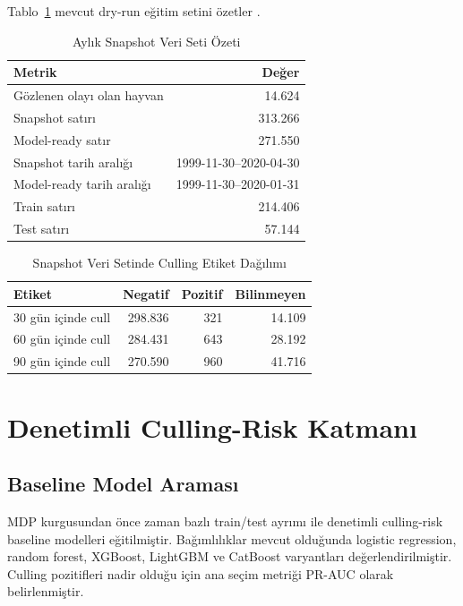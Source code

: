 \documentclass[conference]{IEEEtran}
\begin{document}
Tablo~\ref{tab:dataset_summary} mevcut dry-run eğitim setini özetler
\cite{projectreports}.

\begin{table}[!t]
\caption{Aylık Snapshot Veri Seti Özeti}
\label{tab:dataset_summary}
\centering
\begin{tabular}{lr}
\toprule
Metrik & Değer \\
\midrule
Gözlenen olayı olan hayvan & 14.624 \\
Snapshot satırı & 313.266 \\
Model-ready satır & 271.550 \\
Snapshot tarih aralığı & 1999-11-30--2020-04-30 \\
Model-ready tarih aralığı & 1999-11-30--2020-01-31 \\
Train satırı & 214.406 \\
Test satırı & 57.144 \\
\bottomrule
\end{tabular}
\end{table}

\begin{table}[!t]
\caption{Snapshot Veri Setinde Culling Etiket Dağılımı}
\label{tab:label_distribution}
\centering
\begin{tabular}{lrrr}
\toprule
Etiket & Negatif & Pozitif & Bilinmeyen \\
\midrule
30 gün içinde cull & 298.836 & 321 & 14.109 \\
60 gün içinde cull & 284.431 & 643 & 28.192 \\
90 gün içinde cull & 270.590 & 960 & 41.716 \\
\bottomrule
\end{tabular}
\end{table}

\section{Denetimli Culling-Risk Katmanı}
\subsection{Baseline Model Araması}
MDP kurgusundan önce zaman bazlı train/test ayrımı ile denetimli culling-risk
baseline modelleri eğitilmiştir. Bağımlılıklar mevcut olduğunda logistic
regression, random forest, XGBoost, LightGBM ve CatBoost varyantları
değerlendirilmiştir. Culling pozitifleri nadir olduğu için ana seçim metriği
PR-AUC olarak belirlenmiştir.
\end{document}
